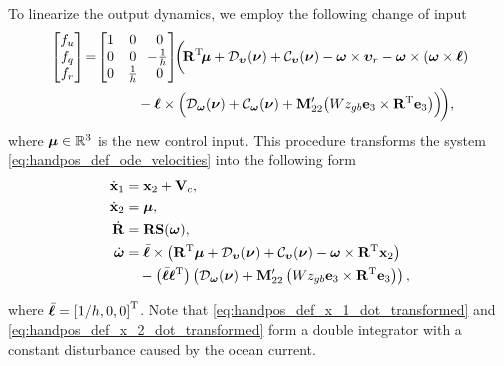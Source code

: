 To linearize the output dynamics, we employ the following change of input
\begin{align}
    \begin{bmatrix}
        f_u \\ f_q \\ f_r
    \end{bmatrix}
    \!&=\!
    \begin{bmatrix}
        1 & 0 & 0 \\ 0 & 0 & \!\!-\frac{1}{h} \\ 0 & \frac{1}{h} & 0
    \end{bmatrix}
    \!\!
    \bigg(\!\mat{R}\T\!\bs{\mu} + \mathcal{D}_{\bvel}(\vel) + \mathcal{C}_{\bvel}(\vel) - \bs{\omega} \times \bvel_r - \bs{\omega} \times \left(\bs{\omega} \times \handl\right) \nonumber \\
    & \qquad \qquad - \handl \times \Bigl(\mathcal{D}_{\bs{\omega}}(\vel) + \mathcal{C}_{\bs{\omega}}(\vel) + \mat{M}_{22}^{\prime}\!\left(Wz_{gb} \mat{e}_3 \times \mat{R}\T \mat{e}_3\right)\Bigr)\! \bigg),
\end{align}
where $\bm{\mu} \in \mathbb{R}^3$ is the new control input.
This procedure transforms the system \eqref{eq:handpos_def_ode_velocities} into the following form
\begin{subequations}
    \begin{align}
        \dot{\mathbf{x}}_1 &= \mathbf{x}_2 + \mathbf{V}_c, \label{eq:handpos_def_x_1_dot_transformed}\\
        \dot{\mathbf{x}}_2 &= \bm{\mu}, \label{eq:handpos_def_x_2_dot_transformed}\\
        \dot{\mathbf{R}} &= \mathbf{R}\mathbf{S}(\bm{\omega}), \label{eq:handpos_def_R_dot_CL} \\
        \dot{\bm{\omega}} &= \Bar{\boldsymbol{\ell}} \times \left(\mathbf{R}^{\mathrm{T}}\bm{\mu} + \mathcal{D}_{\bm{\upsilon}}(\bm{\nu}) + \mathcal{C}_{\bm{\upsilon}}(\bm{\nu}) - \bm{\omega} \times \mathbf{R}^{\mathrm{T}} \mathbf{x}_2\right) \label{eq:handpos_def_omega_dot_CL} \\
            & \quad - \left(\Bar{\boldsymbol{\ell}}\boldsymbol{\ell}^{\mathrm{T}}\right) \left(\mathcal{D}_{\bm{\omega}}(\bm{\nu}) + \mathbf{M}_{22}^{\prime}\left(Wz_{gb} \mathbf{e}_3 \times \mathbf{R}^{\mathrm{T}} \mathbf{e}_3\right)\right), \nonumber
    \end{align} \label{eq:handpos_def_hand_position_dynamics}
\end{subequations}

\noindent where $\Bar{\boldsymbol{\ell}} = \left[1/h, 0, 0\right]^{\mathrm{T}}$.
Note that \eqref{eq:handpos_def_x_1_dot_transformed} and \eqref{eq:handpos_def_x_2_dot_transformed} form a double integrator with a constant disturbance caused by the ocean current.

